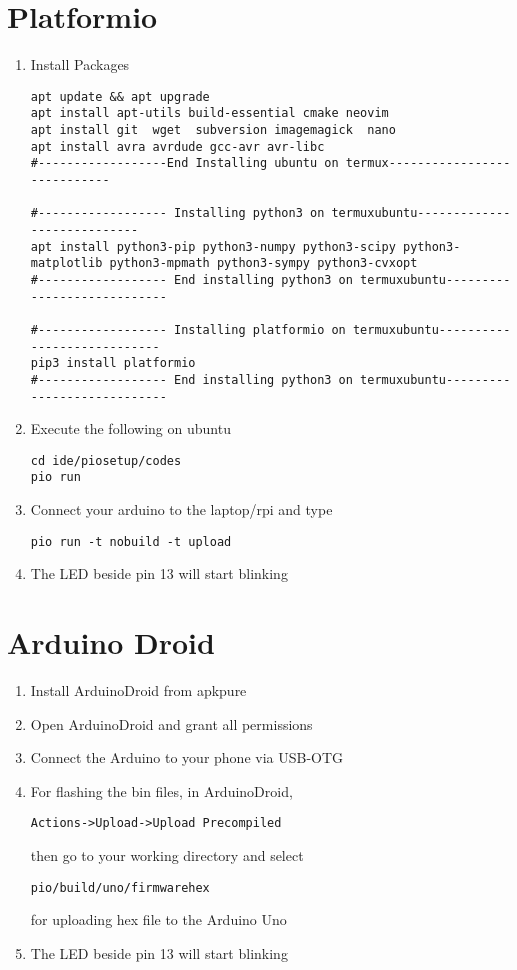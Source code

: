 \documentclass[journal,2pt,twocolumn]{IEEEtran}
\begin{document}
\section{Platformio }
\begin{enumerate}
	\item Install Packages
\begin{lstlisting}
apt update && apt upgrade
apt install apt-utils build-essential cmake neovim
apt install git  wget  subversion imagemagick  nano  
apt install avra avrdude gcc-avr avr-libc
#------------------End Installing ubuntu on termux----------------------------

#------------------ Installing python3 on termuxubuntu----------------------------
apt install python3-pip python3-numpy python3-scipy python3-matplotlib python3-mpmath python3-sympy python3-cvxopt
#------------------ End installing python3 on termuxubuntu----------------------------

#------------------ Installing platformio on termuxubuntu----------------------------
pip3 install platformio
#------------------ End installing python3 on termuxubuntu----------------------------
\end{lstlisting}
\item Execute the following on ubuntu
\begin{lstlisting}
cd ide/piosetup/codes
pio run
\end{lstlisting}
\item Connect your arduino to the  laptop/rpi and type
\begin{lstlisting}
pio run -t nobuild -t upload
\end{lstlisting}
\item The LED beside pin 13 will start
blinking

\end{enumerate}
\section{Arduino Droid}
\begin{enumerate}
\item Install ArduinoDroid from apkpure
\item Open ArduinoDroid and grant all permissions
\item Connect the Arduino to your phone via USB-OTG
\item For flashing the bin files, in ArduinoDroid,
\begin{lstlisting}
Actions->Upload->Upload Precompiled
\end{lstlisting}
then go to your working directory and select
\begin{lstlisting}
pio/build/uno/firmwarehex
\end{lstlisting}
for uploading hex file to the Arduino Uno
\item The LED beside pin 13 will start
blinking
\end{enumerate}


\end{document}
